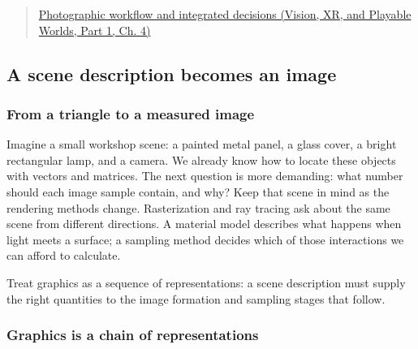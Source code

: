 \begin{quote}
\href{../07-Vision-XR-and-Playable-Worlds-P01/main.pdf\#04-visual-computing-ii-ch034-photographic-workflow-and-integrated-decisions}{Photographic workflow and integrated decisions (Vision, XR, and Playable Worlds, Part 1, Ch. 4)}
\end{quote}

\subsection{A scene description becomes an image}\label{03-visual-computing-i-ch001-a-scene-description-becomes-an-image}

\hypertarget{03-visual-computing-i-ch001-a-scene-description-becomes-an-image}{}

\subsubsection{From a triangle to a measured image}\label{03-visual-computing-i-ch001-from-a-triangle-to-a-measured-image}

\hypertarget{03-visual-computing-i-ch001-from-a-triangle-to-a-measured-image}{}

Imagine a small workshop scene: a painted metal panel, a glass cover, a bright rectangular lamp, and a camera. We already know how to locate these objects with vectors and matrices. The next question is more demanding: what number should each image sample contain, and why? Keep that scene in mind as the rendering methods change. Rasterization and ray tracing ask about the same scene from different directions. A material model describes what happens when light meets a surface; a sampling method decides which of those interactions we can afford to calculate.

Treat graphics as a sequence of representations: a scene description must supply the right quantities to the image formation and sampling stages that follow.

\subsubsection{Graphics is a chain of representations}\label{03-visual-computing-i-ch001-graphics-is-a-chain-of-representations}

\hypertarget{03-visual-computing-i-ch001-graphics-is-a-chain-of-representations}{}

